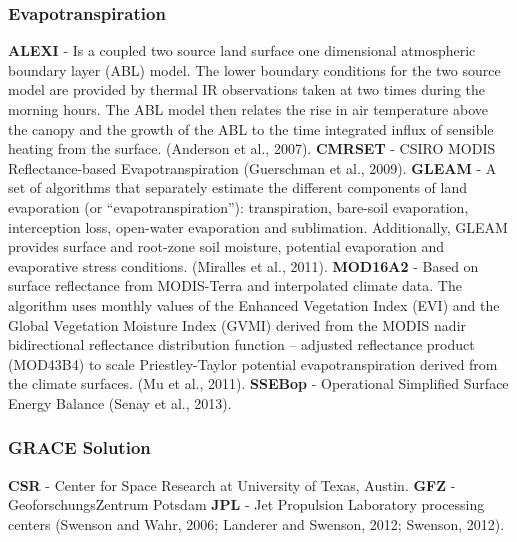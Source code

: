 \documentclass[oneside,openany]{article}%
\begin{document}
%
\subsubsection*{Evapotranspiration}%
\label{ssubsec:Evapotranspiration}%
\textbf{ALEXI} - Is a coupled two source land surface one dimensional atmospheric boundary layer (ABL) model. The lower boundary conditions for the two source model are provided by thermal IR observations taken at two times during the morning hours.  The ABL model then relates the rise in air temperature above the canopy and the growth of the ABL to the time integrated influx of sensible heating from the surface. (Anderson et al., 2007).%
\linebreak%
\textbf{CMRSET} - CSIRO MODIS Reflectance-based Evapotranspiration (Guerschman et al., 2009).%
\linebreak%
\textbf{GLEAM} - A set of algorithms that separately estimate the different components of land evaporation (or “evapotranspiration”): transpiration, bare-soil evaporation, interception loss, open-water evaporation and sublimation. Additionally, GLEAM provides surface and root-zone soil moisture, potential evaporation and evaporative stress conditions. (Miralles et al., 2011).%
\linebreak%
\textbf{MOD16A2} - Based on surface reflectance from MODIS-Terra and interpolated climate data. The algorithm uses monthly values of the Enhanced Vegetation Index (EVI) and the Global Vegetation Moisture Index (GVMI) derived from the MODIS nadir bidirectional reflectance distribution function – adjusted reflectance product (MOD43B4) to scale Priestley-Taylor potential evapotranspiration derived from the climate surfaces. (Mu et al., 2011).%
\linebreak%
\textbf{SSEBop} - Operational Simplified Surface Energy Balance (Senay et al., 2013).%
\linebreak

%
\subsubsection*{GRACE Solution}%
\label{ssubsec:GRACESolution}%
\textbf{CSR} - Center for Space Research at University of Texas, Austin.%
\linebreak%
\textbf{GFZ} - GeoforschungsZentrum Potsdam%
\linebreak%
\textbf{JPL} - Jet Propulsion Laboratory processing centers (Swenson and Wahr, 2006; Landerer and Swenson, 2012; Swenson, 2012).%
\linebreak
\end{document}
